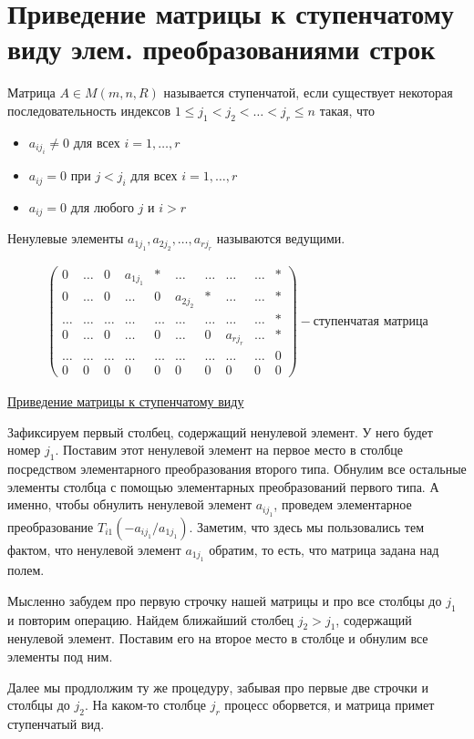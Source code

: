 \section{Приведение матрицы к ступенчатому виду элем. преобразованиями строк}
 \begin{conj}
     Матрица $A \in M(m, n, R)$ называется ступенчатой, если существует некоторая последовательность индексов 
     $1 \leq j_1 < j_2 < \dots < j_r \leq n$ такая, что
     \begin{itemize}
         \item $a_{ij_i} \neq 0$ для всех $i = 1, \dots, r$
         \item $a_{ij} = 0$ при $j < j_i$ для всех $i = 1, \dots, r$
         \item $a_{ij} = 0$ для любого $j$ и $i > r$
     \end{itemize}
     Ненулевые элементы $a_{1j_1}, a_{2j_2}, \dots, a_{rj_r}$ называются ведущими.
 \end{conj}

 \begin{gather*}
     \begin{pmatrix}
         0 & \dots & 0 & a_{1j_1} & * & \dots & \dots & \dots & \dots & * \\
         0 & \dots & 0 & \dots & 0 & a_{2j_2} & * & \dots & \dots & * \\
         \dots & \dots & \dots & \dots & \dots & \dots & \dots & \dots & \dots & * \\
         0 & \dots & 0 & \dots & 0 & \dots & 0 & a_{rj_r} & \dots & * \\
         \dots & \dots & \dots & \dots & \dots & \dots & \dots & \dots & \dots & 0 \\
        0 & 0 & 0 & 0 & 0 & 0 & 0 & 0 & 0 & 0
     \end{pmatrix} - \text{ступенчатая матрица}
 \end{gather*}

 \underline{Приведение матрицы к ступенчатому виду}

 Зафиксируем первый столбец, содержащий ненулевой элемент. 
 У него будет номер $j_1$.
 Поставим этот ненулевой элемент на первое место в столбце посредством элементарного преобразования второго типа.
 Обнулим все остальные элементы столбца с помощью элементарных преобразований первого типа.
 А именно, чтобы обнулить ненулевой элемент $a_{ij_1}$, проведем элементарное преобразование $T_{i1}(-a_{ij_1} / a_{1j_1})$.
 Заметим, что здесь мы пользовались тем фактом, что ненулевой элемент $a_{1j_1}$ обратим, то есть, что матрица задана над полем.

 Мысленно забудем про первую строчку нашей матрицы и про все столбцы до $j_1$ и повторим операцию.
 Найдем ближайший столбец $j_2 > j_1$, содержащий ненулевой элемент. 
 Поставим его на второе место в столбце и обнулим все элементы под ним.

 Далее мы продлолжим ту же процедуру, забывая про первые две строчки и столбцы до $j_2$. 
 На каком-то столбце $j_r$ процесс оборвется, и матрица примет ступенчатый вид. 